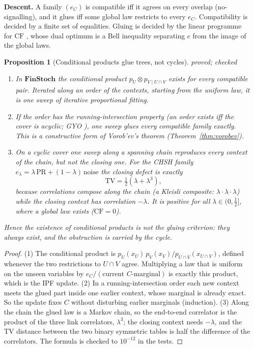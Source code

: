 \documentclass[11pt]{article}
\newtheorem{proposition}[theorem]{Proposition}
\theoremstyle{definition}
\theoremstyle{remark}
\newcommand{\CF}{\mathrm{CF}}
\newcommand{\st}[1]{\textsf{\small\color{gray}#1}}
\begin{document}
\textbf{Descent.} A family $(e_C)$ is compatible iff it agrees on every overlap (no-signalling), and it glues iff some global law restricts to every $e_C$. Compatibility is decided by a finite set of equalities. Gluing is decided by the linear programme for $\CF$ \cite{abm17}, whose dual optimum is a Bell inequality separating $e$ from the image of the global laws.

\begin{proposition}[Conditional products glue trees, not cycles]\label{prop:condprod}\st{proved; checked}
\leavevmode
\begin{enumerate}
  \item In $\mathbf{FinStoch}$ the conditional product $p_U\otimes p_{V\mid U\cap V}$ exists for \emph{every} compatible pair. Iterated along an order of the contexts, starting from the uniform law, it is one sweep of iterative proportional fitting.
  \item If the order has the running-intersection property (an order exists iff the cover is acyclic; GYO \cite{bfmy}), one sweep glues every compatible family exactly. This is a constructive form of Vorob'ev's theorem (Theorem~\ref{thm:vorobev}).
  \item On a cyclic cover one sweep along a spanning chain reproduces every context of the chain, but not the closing one. For the CHSH family \cite{brunner} $e_\lambda=\lambda\,\mathrm{PR}+(1-\lambda)\,\mathrm{noise}$ the closing defect is exactly
  \[ \mathrm{TV}=\tfrac12(\lambda+\lambda^3), \]
  because correlations compose along the chain (a Kleisli composite: $\lambda\cdot\lambda\cdot\lambda$) while the closing context has correlation $-\lambda$. It is positive for all $\lambda\in(0,\tfrac12]$, where a global law exists ($\CF=0$).
\end{enumerate}
Hence the existence of conditional products is not the gluing criterion: they always exist, and the obstruction is carried by the cycle.
\end{proposition}
\begin{proof}
(1) The conditional product is $p_U(x_U)\,p_V(x_V)/p_{U\cap V}(x_{U\cap V})$, defined whenever the two restrictions to $U\cap V$ agree. Multiplying a law that is uniform on the unseen variables by $e_C/(\text{current } C\text{-marginal})$ is exactly this product, which is the IPF update. (2) In a running-intersection order each new context meets the glued part inside one earlier context, whose marginal is already exact. So the update fixes $C$ without disturbing earlier marginals (induction). (3) Along the chain the glued law is a Markov chain, so the end-to-end correlator is the product of the three link correlators, $\lambda^3$; the closing context needs $-\lambda$, and the TV distance between the two binary symmetric tables is half the difference of the correlators. The formula is checked to $10^{-12}$ in the tests.
\end{proof}
\end{document}
